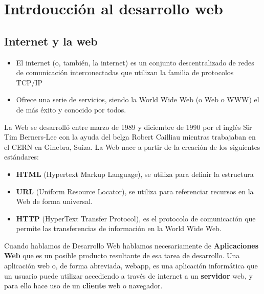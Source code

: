 \documentclass[a4paper,12pt]{article}
\begin{document}


\tableofcontents

\newpage

\section{Intrdoucción al desarrollo web}

\subsection{Internet y la web}
\begin{itemize}
    \item El internet (o, también, la internet) es un conjunto descentralizado
     de redes de comunicación interconectadas que utilizan la familia de 
     protocolos TCP/IP
    \item Ofrece una serie de servicios, siendo la World Wide Web 
    (o Web o WWW) el de más éxito y conocido por todos.
\end{itemize}

La Web se desarrolló entre marzo de 1989 y diciembre de 1990 por el inglés Sir Tim Berners-Lee
con la ayuda del belga Robert Cailliau mientras trabajaban en el CERN en Ginebra, 
Suiza. La Web nace a partir de la creación de los siguientes estándares:

\begin{itemize}
    \item \textbf{HTML} (Hypertext Markup Language), se utiliza para definir la estructura
    \item \textbf{URL}  (Uniform Resource Locator), se utiliza para referenciar recursos en la Web de forma universal.
    \item \textbf{HTTP} (HyperText Transfer Protocol), es el protocolo de comunicación que permite las transferencias de información en la World Wide Web.
\end{itemize}

Cuando hablamos de Desarrollo Web hablamos necesariamente de \textbf{Aplicaciones Web} que
es un posible producto resultante de esa tarea de desarrollo. Una aplicación web o, de forma abreviada, webapp, es una aplicación informática que un
usuario puede utilizar accediendo a través de internet a un \textbf{servidor} web, y para ello hace
uso de un \textbf{cliente} web o navegador.
\end{document}
